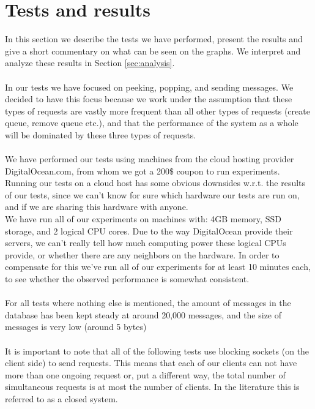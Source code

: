 \documentclass{article}
\begin{document}
    \section{Tests and results}
        \label{sec:tests_and_results}
        In this section we describe the tests we have performed, present the results and give a short commentary on what can be seen on the graphs. We interpret and analyze these results in Section \ref{sec:analysis}.\\
        \\
        In our tests we have focused on peeking, popping, and sending messages. We decided to have this focus because we work under the assumption that these types of requests are vastly more frequent than all other types of requests (create queue, remove queue etc.), and that the performance of the system as a whole will be dominated by these three types of requests.\\
        \\
        We have performed our tests using machines from the cloud hosting provider DigitalOcean.com, from whom we got a 200\$ coupon to run experiments. Running our tests on a cloud host has some obvious downsides w.r.t. the results of our tests, since we can't know for sure which hardware our tests are run on, and if we are sharing this hardware with anyone.\\
        We have run all of our experiments on machines with: 4GB memory, SSD storage, and 2 logical CPU cores. Due to the way DigitalOcean provide their servers, we can't really tell how much computing power these logical CPUs provide, or whether there are any neighbors on the hardware. In order to compensate for this we've run all of our experiments for at least 10 minutes each, to see whether the observed performance is somewhat consistent.\\
        \\
        For all tests where nothing else is mentioned, the amount of messages in the database has been kept steady at around 20,000 messages, and the size of messages is very low (around 5 bytes)\\
        \\
        It is important to note that all of the following tests use blocking sockets (on the client side) to send requests. This means that each of our clients can not have more than one ongoing request or, put a different way, the total number of simultaneous requests is at most the number of clients. In the literature this is referred to as a closed system.\\
\end{document}
